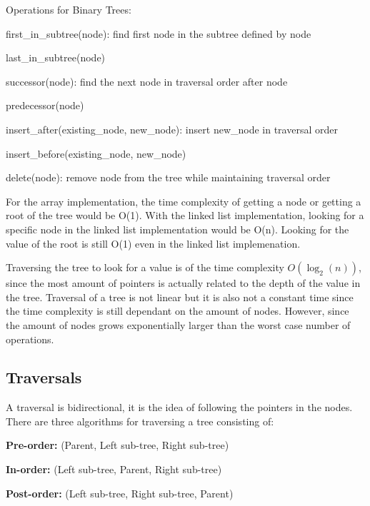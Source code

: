 \documentclass[11pt,a4paper,english]{report}
\begin{document}
\bigskip
\bigskip
\begin{bluebox}{Operations for Binary Trees:} {
\begin{itemize} {

\item first\_in\_subtree(node): find first node in the subtree defined by node
\item last\_in\_subtree(node)
\item successor(node): find the next node in traversal order after node
\item predecessor(node)
\item insert\_after(existing\_node, new\_node): insert new\_node in traversal order
\item insert\_before(existing\_node, new\_node)
\item delete(node): remove node from the tree while maintaining traversal order

}\end{itemize}
}\end{bluebox}


\noindent For the array implementation, the time complexity of getting a node or getting a root of the tree would be O(1). With the linked list implementation, looking for a specific node in the linked list implementation would be O(n). Looking for the value of the root is still O(1) even in the linked list implemenation.


\bigskip
\noindent Traversing the tree to look for a value is of the time complexity $O(\log_{2}(n))$, since the most amount of pointers is actually related to the depth of the value in the tree. Traversal of a tree is not linear but it is also not a constant time since the time complexity is still dependant on the amount of nodes. However, since the amount of nodes grows exponentially larger than the worst case number of operations. 

\subsection{Traversals}

A traversal is bidirectional, it is the idea of following the pointers in the nodes. There are three algorithms for traversing a tree consisting of:
\begin{itemize} {

 
    \item \textbf{Pre-order:} (Parent, Left sub-tree, Right sub-tree)
    \item \textbf{In-order:} (Left sub-tree, Parent, Right sub-tree)
    \item \textbf{Post-order:} (Left sub-tree, Right sub-tree, Parent)

}\end{itemize}
\end{document}
